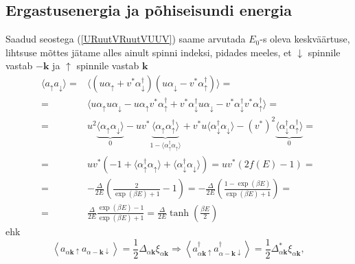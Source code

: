 \documentclass[class=article, crop=false]{standalone}
\begin{document}
\subsection{Ergastusenergia ja põhiseisundi energia}
Saadud seostega (\ref{URuutVRuutVUUV}) saame arvutada $ E_{0} $-s oleva keskväärtuse, lihtsuse mõttes jätame alles ainult spinni indeksi, pidades meeles, et $ \downarrow $ spinnile vastab $ - \mathbf{k} $ ja $ \uparrow $ spinnile vastab $ \mathbf{k} $
\begin{equation}\label{key}
	\begin{split}
		\langle a_{ \uparrow} a_{ \downarrow} \rangle = & \langle (u \alpha_{ \uparrow} + v^{ \ast} \alpha_{ \downarrow}^{ \dagger})(u \alpha_{ \downarrow} - v^{ \ast} \alpha_{ \uparrow}^{ \dagger}) \rangle = \\
		= & \langle u \alpha_{ \uparrow} u \alpha_{ \downarrow} - u \alpha_{ \uparrow} v^{ \ast} \alpha_{ \uparrow}^{ \dagger} + v^{ \ast} \alpha_{ \downarrow}^{ \dagger} u \alpha_{ \downarrow} - v^{ \ast} \alpha_{ \downarrow}^{ \dagger} v^{ \ast} \alpha_{ \uparrow}^{ \dagger} \rangle = \\
		= & u^{2} \underbrace{\langle \alpha_{ \uparrow} \alpha_{ \downarrow} \rangle}_{0} - u v^{ \ast} \underbrace{\langle \alpha_{ \uparrow} \alpha_{ \uparrow}^{ \dagger} \rangle}_{1 - \langle \alpha_{ \uparrow}^{ \dagger} \alpha_{ \uparrow} \rangle} + v^{ \ast} u \langle \alpha_{ \downarrow}^{ \dagger} \alpha_{ \downarrow} \rangle - (v^{ \ast})^{2} \underbrace{\langle \alpha_{ \downarrow}^{ \dagger} \alpha_{ \uparrow}^{ \dagger} \rangle}_{0} = \\
		= & u v^{ \ast} \left( - 1 + \langle \alpha_{ \uparrow}^{ \dagger} \alpha_{ \uparrow} \rangle + \langle \alpha_{ \downarrow}^{ \dagger} \alpha_{ \downarrow} \rangle \right) = u v^{ \ast} \left( 2 f (E) - 1 \right) = \\
		= & - \frac{ \Delta}{2 E} \left( \frac{2}{ \exp ( \beta E) + 1} - 1 \right) = - \frac{ \Delta}{2 E} \left( \frac{1 - \exp ( \beta E)}{ \exp ( \beta E) + 1} \right) = \\
		= & \frac{ \Delta}{2 E} \frac{ \exp ( \beta E) - 1}{ \exp ( \beta E) + 1} = \frac{ \Delta}{2 E} \tanh \left( \frac{ \beta E}{2} \right) 
	\end{split}
\end{equation}
ehk
\begin{equation}\label{key}
	\left\langle a_{ \alpha \mathbf{k} \uparrow} a_{ \alpha -\mathbf{k} \downarrow} \right\rangle = \frac{1}{2} \Delta_{ \alpha \mathbf{k}} \xi_{ \alpha \mathbf{k}} \Rightarrow \left\langle a_{ \alpha \mathbf{k} \uparrow}^{ \dagger} a_{ \alpha -\mathbf{k} \downarrow}^{ \dagger} \right\rangle = \frac{1}{2} \Delta_{ \alpha \mathbf{k}}^{ \ast} \xi_{ \alpha \mathbf{k}},
\end{equation}
\end{document}
